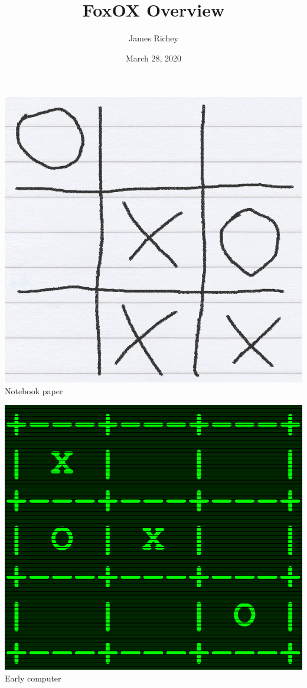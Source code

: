 \documentclass{tufte-handout}
\title{FoxOX Overview}
\author{James Richey}
\date{March 28, 2020}
\begin{document}
\maketitle


\begin{marginfigure}
  \includegraphics[width=\linewidth]{img/concept-art/paper}
  Notebook paper
\end{marginfigure}

\begin{marginfigure}
  \includegraphics[width=\linewidth]{img/concept-art/computer}
  Early computer
\end{marginfigure}
\end{document}
